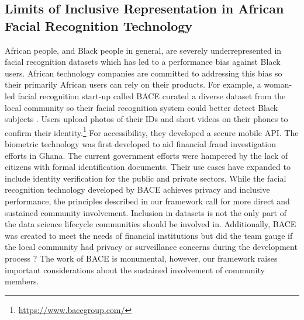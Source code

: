 \subsection{Limits of Inclusive Representation in African Facial Recognition Technology}
African people, and Black people in general, are severely underrepresented in facial recognition datasets which has led to a performance bias against Black users. African technology companies are committed to addressing this bias so their primarily African users can rely on their products. For example, a woman-led facial recognition start-up called BACE curated a diverse dataset from the local community so their facial recognition system could better detect Black subjects \cite{eke2023towards}. Users upload photos of their IDs and short videos on their phones to confirm their identity.\footnote{\url{https://www.bacegroup.com/}} For accessibility, they developed a secure mobile API. The biometric technology was first developed to aid financial fraud investigation efforts in Ghana. The current government efforts were hampered by the lack of citizens with formal identification documents. Their use cases have expanded to include identity verification for the public and private sectors. While the facial recognition technology developed by BACE achieves privacy and inclusive performance, the principles described in our framework call for more direct and sustained community involvement. Inclusion in datasets is not the only part of the data science lifecycle communities should be involved in. Additionally, BACE was created to meet the needs of financial institutions but did the team gauge if the local community had privacy or surveillance concerns during the development process \cite{birhane2020algorithmic}? The work of BACE is monumental, however, our framework raises important considerations about the sustained involvement of community members.

